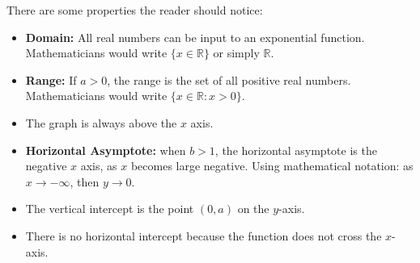 \begin{center}
\end{center}

There are some properties the reader should notice:
\begin{itemize}
    \item \textbf{Domain:} All real numbers can be input to an exponential function. Mathematicians would write $\{x \in \mathbb{R}\}$ or simply $\mathbb{R}$.
    \item \textbf{Range:} If $a>0$, the range is the set of all positive real numbers. Mathematicians would write $\{x \in \mathbb{R}: x>0\}$.
    \item The graph is always above the $x$ axis.
    \item \textbf{Horizontal Asymptote:} when $b > 1$, the horizontal asymptote is the negative $x$ axis, as $x$ becomes large negative. Using mathematical notation: as $x \to -\infty$, then $y \to 0$.
    \item The vertical intercept is the point $(0,a)$ on the $y$-axis.
    \item There is no horizontal intercept because the function does not cross the $x$-axis.
\end{itemize}


